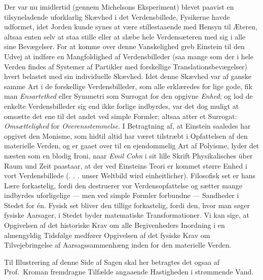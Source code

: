 \documentclass[12pt,a4paper]{article}
\newcommand{\opage}[1]{\marginnote{\footnotesize\textit{[#1]}}}
\begin{document}
Der var nu imidlertid (gennem Michelsons Eksperiment) blevet paavist en
tilsyneladende uforklarlig Skævhed i det Verdensbillede, Fysikerne havde
udformet, idet Jorden kunde synes at være stillestaaende med Hensyn til
Æteren, altsaa enten selv at staa stille eller at slæbe hele Verdensæteren med
sig i alle sine Bevægelser. For at komme over denne Vanskelighed greb Einstein
til den Udvej at indføre en Mangfoldighed af Verdensbilleder (saa mange som der
i hele Verden findes af Systemer af Partikler med forskellige
Translationsbevægelser) hvert belastet med sin individuelle Skævhed. Idet denne
Skævhed var af ganske samme Art i de forskellige Verdensbilleder, som alle
erklæredes for lige gode, fik man \emph{Ensartethed} eller Symmetri som
Surrogat for den opgivne \emph{Enhed}; og lod de enkelte Verdensbilleder sig
end ikke forlige indbyrdes, var det dog muligt at omsætte det ene til det andet
ved simple Formler; altsaa atter et Surrogat: \emph{Omsættelighed} for
\emph{Overensstemmelse}. I Betragtning af, at Einstein saaledes har opgivet den
Monisme, som hidtil altid har været tilstræbt i Opfattelsen af den materielle
Verden, og er gaaet over til en ejendommelig Art af \guillemotleft
Polyisme\guillemotright, lyder det næsten som en blodig Ironi, naar \emph{Emil
Cohn} i sit lille Skrift \guillemotleft Physikalisches über Raum und
Zeit\guillemotright{} paastaar, at der ved Einsteins
\opage{8} Teori er kommet større Enhed i vort Verdensbillede (\guillemotleft . . . unser
Weltbild wird einheitlicher\guillemotright). Filosofisk set er hans Lære
forkastelig, fordi den destruerer vor Verdensopfattelse og sætter mange
indbyrdes uforligelige --- men ved simple Formler forbundne --- Sandheder i
Stedet for én. Fysisk set bliver den tillige forkastelig, fordi den, hvor man
søger fysiske Aarsager, i Stedet byder matematiske Transformationer. Vi kan
sige, at Opgivelsen af det historiske Krav om alle Begivenheders Inordning i en
almengyldig Tidsfølge medfører Opgivelsen af det fysiske Krav om
Tilvejebringelse af Aarsagssammenhæng inden for den materielle Verden.

Til Illustrering af denne Side af Sagen skal her betragtes det ogsaa af Prof.\
Kroman fremdragne Tilfælde angaaende Hastigheden i strømmende Vand.
\end{document}
